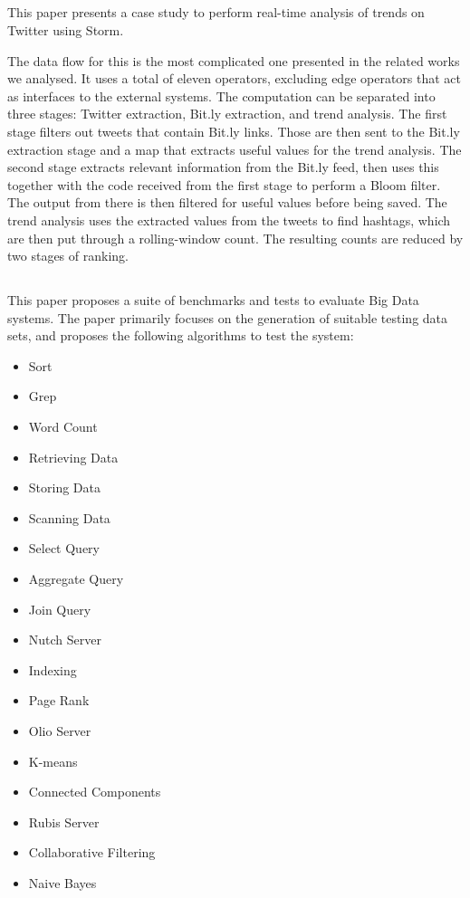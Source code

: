 \subsection{}
This paper\cite{storm2} presents a case study to perform real-time analysis of trends on Twitter using Storm. \\


The data flow for this is the most complicated one presented in the related works we analysed. It uses a total of eleven operators, excluding edge operators that act as interfaces to the external systems. The computation can be separated into three stages: Twitter extraction, Bit.ly extraction, and trend analysis. The first stage filters out tweets that contain Bit.ly links. Those are then sent to the Bit.ly extraction stage and a map that extracts useful values for the trend analysis. The second stage extracts relevant information from the Bit.ly feed, then uses this together with the code received from the first stage to perform a Bloom filter. The output from there is then filtered for useful values before being saved. The trend analysis uses the extracted values from the tweets to find hashtags, which are then put through a rolling-window count. The resulting counts are reduced by two stages of ranking.

\subsection{}
This paper\cite{bigdatabench} proposes a suite of benchmarks and tests to evaluate Big Data systems. The paper primarily focuses on the generation of suitable testing data sets, and proposes the following algorithms to test the system:

\begin{multicols}{2}
  \begin{itemize}
  \item Sort
  \item Grep
  \item Word Count
  \item Retrieving Data
  \item Storing Data
  \item Scanning Data
  \item Select Query
  \item Aggregate Query
  \item Join Query
  \item Nutch Server
  \item Indexing
  \item Page Rank
  \item Olio Server
  \item K-means
  \item Connected Components
  \item Rubis Server
  \item Collaborative Filtering
  \item Naive Bayes
  \end{itemize}
\end{multicols}

